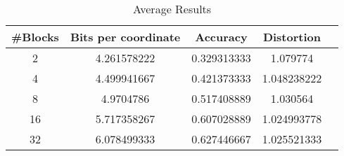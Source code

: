 \begin{table}[h!]
	\centering
	\caption{Average Results \clust{} \qsr{}}
	\label{table:avg_clust_qsr}
	\begin{tabular}{ccccc}
		\hline
		\#Blocks & Bits per coordinate & Accuracy  & Distortion \\ \hline
		2 & 4.261578222	& 0.329313333 & 1.079774  \\
		4 & 4.499941667 & 0.421373333 & 1.048238222  \\
		8 & 4.9704786 & 0.517408889 & 1.030564 \\
		16 & 5.717358267 & 0.607028889 & 1.024993778 \\
		32 & 6.078499333 & 0.627446667 & 1.025521333 \\
		\hline
	\end{tabular}
\end{table}